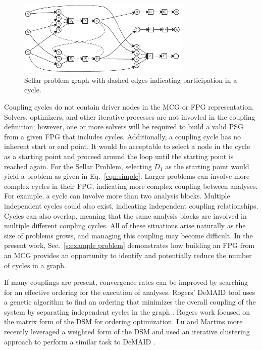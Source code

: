   \begin{figure}[htb!]
    \begin{center}
      \includegraphics[width=3.25in]{images/sellar_cycles}
    \end{center}
    \caption{Sellar problem graph with dashed edges indicating %
    participation in a cycle.\label{f:sellar cycles}}
  \end{figure} 

  Coupling cycles do not contain driver nodes in the MCG or FPG representation. 
  Solvers, optimizers, and other iterative processes are not invovled in the coupling 
  definition; however, one or more solvers will be required to build a valid PSG from a 
  given FPG  that includes cycles. Additionally, a coupling cycle has no inherent 
  start or end point. It would be acceptable to select a
  node in the cycle as a starting point and proceed around the
  loop until the starting point is reached again. For the Sellar Problem, selecting 
  $D_1$ as the starting point would yield a problem as given in 
  Eq.~\ref{eqn:simple}.
  Larger problems can involve more complex cycles in their FPG, indicating more 
  complex coupling between analyses. For example, a cycle can involve more than 
   two analysis blocks. Multiple independent cycles could also exist, indicating 
  independent coupling relationships. Cycles can also overlap, meaning that the same analysis 
  blocks are involved in multiple different coupling cycles. All of these situations
  arise naturally as the size of problems grows, and managing this coupling may
  become difficult. In the present work, Sec.~\ref{s:example problem}
  demonstrates how building an FPG from an MCG provides an opportunity to 
  identify and potentially reduce the number of cycles in a graph. 

  If many couplings are present, convergence rates can be improved by 
  searching for an effective ordering for the execution of analyses.
  Rogers' DeMAID tool uses a genetic algorithm to find an ordering that minimizes 
  the overall coupling of the system by separating independent cycles in the 
  graph \cite{rogers1996,rogers1996demaid}. Rogers work focused on the matrix 
  form of the DSM for ordering optimization. Lu and Martins more recently leveraged 
  a weighted form of the DSM and used an iterative clustering approach to perform a 
  similar task to DeMAID \cite{Lu2012}.

